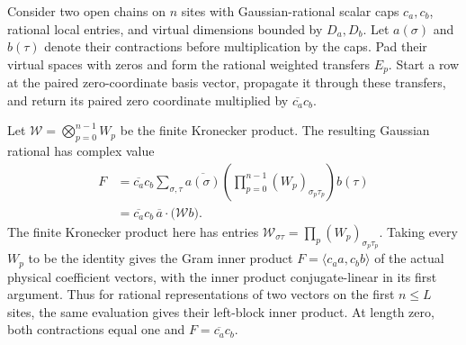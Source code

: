 \begin{lemma}
    \label{lem:lvv_rational_weighted_overlap}
    \leanok
    Consider two open chains on $n$ sites with Gaussian-rational scalar
    caps $c_a,c_b$, rational local entries, and virtual dimensions bounded
    by $D_a,D_b$. Let $a(\sigma)$ and $b(\tau)$ denote their contractions
    before multiplication by the caps. Pad their virtual spaces with
    zeros and form the rational weighted transfers $E_p$.
    Start a row at the paired zero-coordinate basis vector, propagate it
    through these transfers, and return its paired zero coordinate
    multiplied by $\overline{c_a}c_b$.

    Let $\mathcal W=\bigotimes_{p=0}^{n-1}W_p$ be the finite Kronecker
    product. The resulting Gaussian rational has complex value
    \begin{align*}
        F & =\overline{c_a}c_b
        \sum_{\sigma,\tau}
        \overline{a(\sigma)}
        \left(\prod_{p=0}^{n-1}(W_p)_{\sigma_p\tau_p}\right)b(\tau) \\
          & =\overline{c_a}c_b\,
        \overline a\mathbin{\cdot}\bigl(\mathcal W b\bigr).
    \end{align*}
    The finite Kronecker product here has entries
    $\mathcal W_{\sigma\tau}=\prod_p(W_p)_{\sigma_p\tau_p}$.
    Taking every $W_p$ to be the identity gives the Gram inner product
    $F=\langle c_a a,c_b b\rangle$ of the actual physical coefficient
    vectors, with the inner product conjugate-linear in its first argument.
    Thus for rational representations of two vectors on the first
    $n\le L$ sites, the same evaluation gives their left-block inner product.
    At length zero, both contractions equal one and $F=\overline{c_a}c_b$.
\end{lemma}
